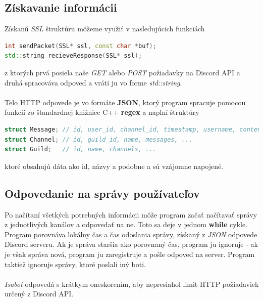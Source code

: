 \documentclass[a4paper,12pt]{article}
\begin{document}
\subsection{Získavanie informácii}
Získanú \textit{SSL} štruktúru môžeme využiť v nasledujúcich funkciách
\begin{lstlisting}[language=C++]
int sendPacket(SSL* ssl, const char *buf);
std::string recieveResponse(SSL* ssl);
\end{lstlisting}
z ktorých prvá posiela naše \textit{GET} alebo \textit{POST} požiadavky na Discord API a druhá spracováva odpoveď a vráti ju vo forme \textit{std::string}. \cite{stackoverflow}
\\\\
Telo HTTP odpovede je vo formáte \textbf{JSON}, ktorý program spracuje pomocou funkcií zo štandardnej knižnice C++ \textbf{regex} a naplní štruktúry 
\begin{lstlisting}[language=C++]
struct Message; // id, user_id, channel_id, timestamp, username, content, ...
struct Channel; // id, guild_id, name, messages, ...
struct Guild;   // id, name, channels, ...
\end{lstlisting}
ktoré obsahujú dáta ako id, názvy a podobne a sú vzájomne napojené.

\subsection{Odpovedanie na správy používateľov}
Po načítaní všetkých potrebných informácii môže program začať načítavať správy z jednotlivých kanálov a odpovedať na ne. Toto sa deje v jednom \textbf{while} cykle. Program porovnáva lokálny čas a čas odoslania správy, získaný z \textit{JSON} odpovede Discord serveru. Ak je správa staršia ako porovnaný čas, program ju ignoruje - ak je však správa nová, program ju zaregistruje a pošle odpoveď na server. Program taktiež ignoruje správy, ktoré poslali iný boti.
\\\\
\textit{Isabot} odpovedá s krátkym oneskorením, aby nepresiahol limit HTTP požiadaviek určený z Discord API.

\newpage
\end{document}

